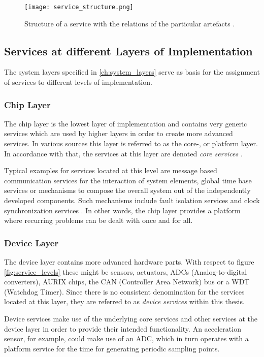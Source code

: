 \begin{figure}[!htbp]
\centering
\texttt{[image: service\_structure.png]}
\caption{Structure of a service with the relations of the particular artefacts \cite[p.45]{krafzig}.}
\label{fig:service}
\end{figure}




\subsection{Services at different Layers of Implementation}
\label{ch:service_layers}
The system layers specified in \ref{ch:system_layers} serve as basis for the assignment of services to different levels of implementation.

\subsubsection{Chip Layer}
The chip layer is the lowest layer of implementation and contains very generic services which are used by higher layers in order to create more advanced services. In various sources this layer is referred to as the core-, or platform layer. In accordance with that, the services at this layer are denoted \emph{core services} \cite[p.44]{genesys}.

Typical examples for services located at this level are message based communication services for the interaction of system elements, global time base services or mechanisms to compose the overall system out of the independently developed components. Such mechanisms include fault isolation services and clock synchronization services \cite[p.7-12]{genesys}. In other words, the chip layer provides a platform where recurring problems can be dealt with once and for all.

\subsubsection{Device Layer}
The device layer contains more advanced hardware parts. With respect to figure \ref{fig:service_levels} these might be sensors, actuators, ADCs (Analog-to-digital converters), AURIX chips, the CAN (Controller Area Network) bus or a WDT (Watchdog Timer). Since there is no consistent denomination for the services located at this layer, they are referred to as \emph{device services} within this thesis.

Device services make use of the underlying core services and other services at the device layer in order to provide their intended functionality. An acceleration sensor, for example, could make use of an ADC, which in turn operates with a platform service for the time for generating periodic sampling points.


